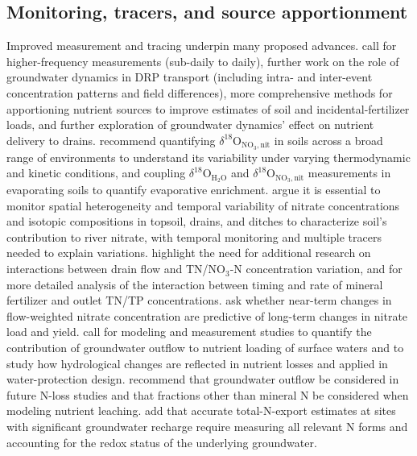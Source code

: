 \documentclass[11pt]{article}
\begin{document}
\subsection{Monitoring, tracers, and source apportionment}
Improved measurement and tracing underpin many proposed advances. \textcite{Williams2022} call for higher-frequency measurements (sub-daily to daily), further work on the role of groundwater dynamics in DRP transport (including intra- and inter-event concentration patterns and field differences), more comprehensive methods for apportioning nutrient sources to improve estimates of soil and incidental-fertilizer loads, and further exploration of groundwater dynamics' effect on nutrient delivery to drains. \textcite{Hu2024} recommend quantifying $\delta^{18}$O$_{\mathrm{NO_3,nit}}$ in soils across a broad range of environments to understand its variability under varying thermodynamic and kinetic conditions, and coupling $\delta^{18}$O$_{\mathrm{H_2O}}$ and $\delta^{18}$O$_{\mathrm{NO_3,nit}}$ measurements in evaporating soils to quantify evaporative enrichment. \textcite{Briand2017} argue it is essential to monitor spatial heterogeneity and temporal variability of nitrate concentrations and isotopic compositions in topsoil, drains, and ditches to characterize soil's contribution to river nitrate, with temporal monitoring and multiple tracers needed to explain variations. \textcite{Lagzdins2015} highlight the need for additional research on interactions between drain flow and TN/NO$_3$-N concentration variation, and for more detailed analysis of the interaction between timing and rate of mineral fertilizer and outlet TN/TP concentrations. \textcite{Danalatos2022} ask whether near-term changes in flow-weighted nitrate concentration are predictive of long-term changes in nitrate load and yield. \textcite{Turunen2013} call for modeling and measurement studies to quantify the contribution of groundwater outflow to nutrient loading of surface waters and to study how hydrological changes are reflected in nutrient losses and applied in water-protection design. \textcite{Jokinen2024} recommend that groundwater outflow be considered in future N-loss studies and that fractions other than mineral N be considered when modeling nutrient leaching. \textcite{Barkle2021} add that accurate total-N-export estimates at sites with significant groundwater recharge require measuring all relevant N forms and accounting for the redox status of the underlying groundwater.
\end{document}

